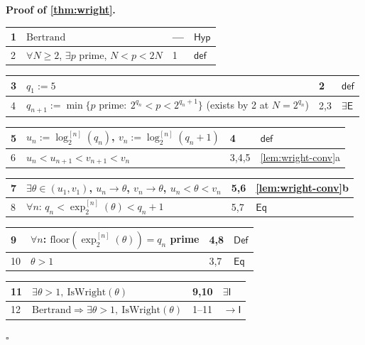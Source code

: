 \documentclass[11pt,reqno]{amsart}
\theoremstyle{blueplain}
\renewcommand{\qedsymbol}{\textcolor{proofqed}{\ensuremath{\square}}}
\renewenvironment{proof}[1][Proof]{\par\noindent\textbf{\textcolor{proofhead}{#1.}}\par\nobreak}{\par\nobreak\hfill\qedsymbol}
\numberwithin{equation}{section}
\begin{document}
\begin{proof}[\textbf{Proof of \cref{thm:wright}}]
\label{proof:wright}
{\scriptsize
\begin{tabular}{|m{0.7cm}|m{12cm}|m{1.4cm}|m{2.5cm}|}
\hline
1 & $\text{Bertrand}$ & --- & $\mathsf{Hyp}$ \\ \hline
2 & $\forall N\ge2$, $\exists p$ prime, $N<p<2N$ & 1 & $\mathsf{def}$ \\
\end{tabular}%
\noindent \newline
\noindent
\begin{tabular}{|m{0.7cm}|m{12cm}|m{1.4cm}|m{2.5cm}|}
\hline
3 & $q_1:=5$ & 2 & $\mathsf{def}$ \\ \hline
4 & $q_{n+1}:=\min\{p \text{ prime}:\ 2^{q_n}<p<2^{q_n+1}\}$ (exists by 2 at $N=2^{q_n}$) & 2,3 & $\exists\mathsf{E}$ \\
\end{tabular}%
\noindent \newline
\noindent
\begin{tabular}{|m{0.7cm}|m{12cm}|m{1.4cm}|m{2.5cm}|}
\hline
5 & $u_n:=\log_2^{[n]}(q_n)$, $v_n:=\log_2^{[n]}(q_n+1)$ & 4 & $\mathsf{def}$ \\ \hline
6 & $u_n<u_{n+1}<v_{n+1}<v_n$ & 3,4,5 & \cref{lem:wright-conv}a \\
\end{tabular}%
\noindent \newline
\noindent
\begin{tabular}{|m{0.7cm}|m{12cm}|m{1.4cm}|m{2.5cm}|}
\hline
7 & $\exists\theta\in(u_1,v_1)$, $u_n\to\theta$, $v_n\to\theta$, $u_n<\theta<v_n$ & 5,6 & \cref{lem:wright-conv}b \\ \hline
8 & $\forall n$: $q_n<\exp_2^{[n]}(\theta)<q_n+1$ & 5,7 & $\mathsf{Eq}$ \\
\end{tabular}%
\noindent \newline
\noindent
\begin{tabular}{|m{0.7cm}|m{12cm}|m{1.4cm}|m{2.5cm}|}
\hline
9 & $\forall n$: $\mathrm{floor}(\exp_2^{[n]}(\theta))=q_n$ prime & 4,8 & $\mathsf{Def}$ \\ \hline
10 & $\theta>1$ & 3,7 & $\mathsf{Eq}$ \\
\end{tabular}%
\noindent \newline
\noindent
\begin{tabular}{|m{0.7cm}|m{12cm}|m{1.4cm}|m{2.5cm}|}
\hline
11 & $\exists\theta>1,\ \mathrm{IsWright}(\theta)$ & 9,10 & $\exists\mathsf{I}$ \\ \hline
12 & $\text{Bertrand}\Rightarrow\exists\theta>1,\ \mathrm{IsWright}(\theta)$ & 1--11 & $\rightarrow\mathsf{I}$ \\
\end{tabular}%
}
\end{proof}
\end{document}
